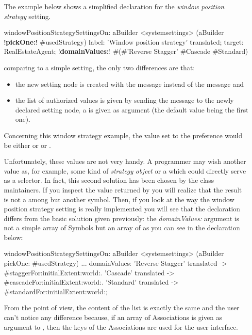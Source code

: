 \documentclass[a4paper,10pt,twoside]{book}
\begin{document}
The example below shows a simplified declaration for the \textit{window position strategy} setting. 
\begin{code}{}
windowPositionStrategySettingsOn: aBuilder
	<systemsettings>
	(aBuilder !\textbf{pickOne:}! #usedStrategy) 
		label: 'Window position strategy' translated;
		target: RealEstateAgent;
		!\textbf{domainValues:}! #(#'Reverse Stagger' #Cascade #Standard)
\end{code}
comparing to a simple setting, the only two differences are that:
\begin{itemize}
\item 
	the new setting node is created with the  message instead of the  message and
\item the list of authorized values is given by sending the  message to the newly declared setting node, a  is given as argument (the default value being the first one).
\end{itemize}

Concerning this window strategy example, the value set to the preference would be either  or  or . 

Unfortunately, these values are not very handy. A programmer may wish another value as, for example, some kind of \textit{strategy object} or a  which could directly serve as a selector. In fact, this second solution has been chosen by the  class maintainers.
If you inspect the value returned by  you will realize that the result is not a  among  but another symbol. Then, if you look at the way the window position strategy setting is really implemented you will see that the declaration differs from the basic solution given previously: the \textit{domainValues:} argument is not a simple array of {Symbol}s but an array of  as you can see in the declaration below:

\begin{code}{}
windowPositionStrategySettingsOn: aBuilder
	<systemsettings> 
	(aBuilder pickOne: #usedStrategy)
	...
	domainValues: {'Reverse Stagger' translated -> #staggerFor:initialExtent:world:. 'Cascade' translated -> #cascadeFor:initialExtent:world:. 'Standard' translated -> #standardFor:initialExtent:world:};
\end{code}

From the \setbrowser point of view, the content of the list is exactly the same and the user can't notice any difference because, if an array of Associations is given as argument to , then the keys of the Associations are used for the user interface. 
\end{document}
